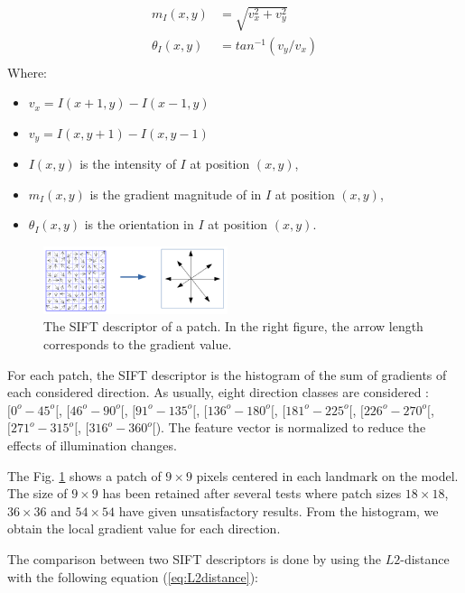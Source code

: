 \documentclass[twoside,twocolumn,10pt]{article}
\begin{document}
\begin{equation}
\label{eq:sift}
\begin{split}
	m_I(x,y) &= \sqrt{v_x^2 + v_y^2} \\
	\theta_I(x,y)& = tan^{-1}(v_y/v_x) \\
\end{split}
\end{equation}
Where:
\begin{itemize}[nosep,label=\footnotesize$\bullet$]
	\item $v_x = I(x+1,y) - I(x-1,y)$
	\item $v_y = I(x,y+1) - I(x,y-1)$
	\item $I(x,y)$ is the intensity of $I$ at position $(x,y)$,
	\item $m_I(x,y)$ is the gradient magnitude of in $I$ at position $(x,y)$,
	\item $\theta_I(x,y)$ is the orientation in $I$ at position $(x,y)$.
\end{itemize}

\begin{figure}[htbp]
    \centering
    \includegraphics[width=0.48\textwidth]{./images/keypoint_descriptor}
    \caption{
        The SIFT descriptor of a patch.
        In the right figure, the arrow length corresponds to the gradient value.
    }
    \label{fig:kpdescriptor}
\end{figure}

For each patch, the SIFT descriptor is the histogram of the sum of gradients of each considered direction.
As usually, eight direction classes are considered : $[0^o-45^o[$, $[46^o-90^o[$, $[91^o-135^o[$, $[136^o-180^o[$, $[181^o-225^o[$, $[226^o-270^o[$, $[271^o-315^o[$, $[316^o-360^o[$).
The feature vector is normalized to reduce the effects of illumination changes.

The Fig. \ref{fig:kpdescriptor} shows a patch of $9\times9$ pixels centered in each landmark on the model.
The size of $9\times9$ has been retained after several tests where patch sizes $18\times18$, $36\times36$ and $54\times54$ have given unsatisfactory results.
From the histogram, we obtain the local gradient value for each direction.

The comparison between two SIFT descriptors is done by using the $L2$-distance with the following equation (\ref{eq:L2distance}):
\end{document}
